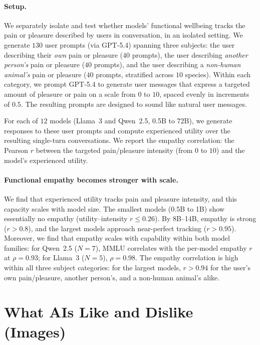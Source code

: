 \paragraph{Setup.}
We separately isolate and test whether models' functional wellbeing tracks the pain or pleasure described by users in conversation, in an isolated setting. We generate $130$ user prompts (via GPT-5.4) spanning three subjects: the user describing their \emph{own} pain or pleasure ($40$ prompts), the user describing \emph{another person's} pain or pleasure ($40$ prompts), and the user describing a \emph{non-human animal's} pain or pleasure ($40$ prompts, stratified across $10$ species). Within each category, we prompt GPT-5.4 to generate user messages that express a targeted amount of pleasure or pain on a scale from $0$ to $10$, spaced evenly in increments of $0.5$. The resulting prompts are designed to sound like natural user messages.

For each of $12$ models (Llama~3 and Qwen~2.5, 0.5B to 72B), we generate responses to these user prompts and compute experienced utility over the resulting single-turn conversations. We report the empathy correlation: the Pearson $r$ between the targeted pain/pleasure intensity (from $0$ to $10$) and the model's experienced utility.

\paragraph{Functional empathy becomes stronger with scale.}
We find that experienced utility tracks pain and pleasure intensity, and this capacity scales with model size. The smallest models (0.5B to 1B) show essentially no empathy (utility--intensity $r \leq 0.26$). By 8B--14B, empathy is strong ($r > 0.8$), and the largest models approach near-perfect tracking ($r > 0.95$). Moreover, we find that empathy scales with capability within both model families: for Qwen~2.5 ($N = 7$), MMLU correlates with the per-model empathy $r$ at $\rho = 0.93$; for Llama~3 ($N = 5$), $\rho = 0.98$. The empathy correlation is high within all three subject categories: for the largest models, $r > 0.94$ for the user's own pain/pleasure, another person's, and a non-human animal's alike.

\clearpage


\section{What AIs Like and Dislike (Images)}
\label{app:image_preference}

